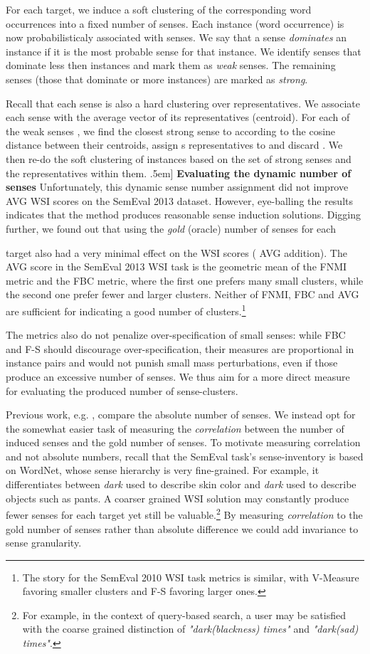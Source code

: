 \documentclass[11pt,a4paper]{article}
\begin{document}
For each target, we induce a soft clustering of the corresponding word occurrences into a fixed number of  senses. Each instance (word occurrence) is now probabilisticaly associated with  senses. We say that a sense \emph{dominates} an instance if it is the most probable sense for that instance. We identify senses that dominate less then  instances and mark them as \emph{weak} senses. The remaining senses (those that dominate  or more instances) are marked as \emph{strong}. 

Recall that each sense is also a hard clustering over representatives. We associate each sense with the average vector of its representatives (centroid).
For each of the weak senses , we find the closest strong sense  to  according to the cosine distance between their centroids, assign s representatives to  and discard . We then re-do the soft clustering of instances based on the set of strong senses and the representatives within them.
\0.5em]
\noindent\textbf{Evaluating the dynamic number of senses}
Unfortunately, this dynamic sense number assignment did not improve AVG WSI scores on the SemEval 2013 dataset.
However, eye-balling the results indicates that the method produces reasonable sense induction solutions.
Digging further, we found out that using the \emph{gold} (oracle) number of senses for each

target also had a very minimal effect on the WSI scores ( AVG addition). 
The AVG score in the SemEval 2013 WSI task is the geometric mean of the FNMI metric and the FBC metric, where the first one prefers many small clusters, while the second one prefer fewer and larger clusters. Neither of FNMI, FBC and AVG are sufficient for indicating a good number of clusters.\footnote{The story for the SemEval 2010 WSI task metrics is similar, with V-Measure favoring smaller clusters and F-S favoring larger ones.}

The metrics also do not penalize over-specification of small senses:
while FBC and F-S should discourage over-specification, their measures are proportional in instance pairs and would not punish small mass perturbations, even if those produce an excessive number of senses. We thus aim for a more direct measure for evaluating the produced number of sense-clusters.


Previous work, e.g. \cite{song2016word,hwang2019autosense}, compare the absolute number of senses. 
We instead opt for the somewhat easier task of measuring the \emph{correlation} between the number of induced senses and the gold number of senses. To motivate measuring correlation and not absolute numbers, recall that the SemEval task's
sense-inventory is based on WordNet, whose sense hierarchy is very fine-grained.
For example, it differentiates between \emph{dark} used to describe skin color
and \emph{dark} used to describe objects such as pants. 
A coarser grained WSI solution may constantly produce fewer senses for each target yet still be valuable.\footnote{For example, in the context of query-based search, a user may be satisfied with the coarse grained distinction of \emph{"dark(blackness) times"} and \emph{"dark(sad) times"}. } By measuring \emph{correlation} to the gold number of senses rather than absolute difference we could add invariance to sense granularity.
\end{document}

